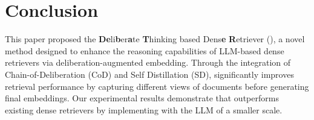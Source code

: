 \section{Conclusion}
This paper proposed the \textbf{D}\textbf{e}li\textbf{b}er\textbf{a}te \textbf{T}hinking based Dens\textbf{e} \textbf{R}etriever (\method{}), a novel method designed to enhance the reasoning capabilities of LLM-based dense retrievers via deliberation-augmented embedding. 
Through the integration of Chain-of-Deliberation (CoD) and Self Distillation (SD), \method{} significantly improves retrieval performance by capturing different views of documents before generating final embeddings. 
Our experimental results demonstrate that \method{} outperforms existing dense retrievers by implementing with the LLM of a smaller scale.
